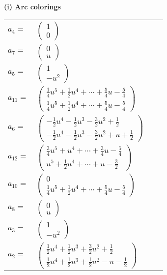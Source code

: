 \documentclass[1p]{elsarticle_modified}
\theoremstyle{definition}
\begin{document}
\flushleft \textbf{(i) Arc colorings}\\
\begin{tabular}{m{7pt} m{180pt} m{7pt} m{180pt} }
\flushright $a_{4}=$&$\begin{pmatrix}1\\0\end{pmatrix}$ \\
\flushright $a_{7}=$&$\begin{pmatrix}0\\u\end{pmatrix}$ \\
\flushright $a_{5}=$&$\begin{pmatrix}1\\- u^2\end{pmatrix}$ \\
\flushright $a_{11}=$&$\begin{pmatrix}\frac{1}{4} u^5+\frac{1}{2} u^4+\cdots+\frac{5}{4} u-\frac{5}{4}\\\frac{1}{4} u^5+\frac{1}{2} u^4+\cdots+\frac{5}{4} u-\frac{5}{4}\end{pmatrix}$ \\
\flushright $a_{6}=$&$\begin{pmatrix}-\frac{1}{2} u^4-\frac{1}{2} u^3-\frac{3}{2} u^2+\frac{1}{2}\\-\frac{1}{2} u^4-\frac{1}{2} u^3-\frac{3}{2} u^2+u+\frac{1}{2}\end{pmatrix}$ \\
\flushright $a_{12}=$&$\begin{pmatrix}\frac{3}{4} u^5+u^4+\cdots+\frac{3}{4} u-\frac{5}{4}\\u^5+\frac{1}{2} u^4+\cdots+u-\frac{3}{2}\end{pmatrix}$ \\
\flushright $a_{10}=$&$\begin{pmatrix}0\\\frac{1}{4} u^5+\frac{1}{2} u^4+\cdots+\frac{5}{4} u-\frac{5}{4}\end{pmatrix}$ \\
\flushright $a_{8}=$&$\begin{pmatrix}0\\u\end{pmatrix}$ \\
\flushright $a_{3}=$&$\begin{pmatrix}1\\- u^2\end{pmatrix}$ \\
\flushright $a_{2}=$&$\begin{pmatrix}\frac{1}{2} u^4+\frac{1}{2} u^3+\frac{3}{2} u^2+\frac{1}{2}\\\frac{1}{2} u^4+\frac{1}{2} u^3+\frac{1}{2} u^2- u-\frac{1}{2}\end{pmatrix}$ \\

\end{tabular}
\end{document}
